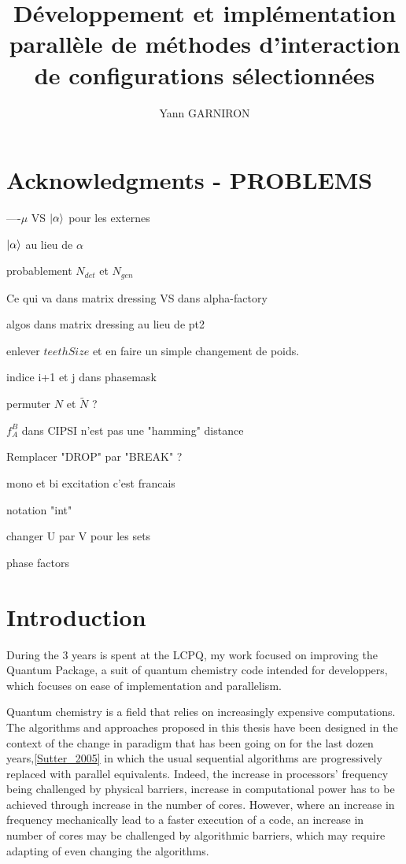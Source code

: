 \documentclass[12pt,a4paper]{report}
\title{Développement et implémentation parallèle de méthodes d'interaction de configurations sélectionnées}
\author{Yann GARNIRON}
\begin{document}
\dominitoc

\makeflyleaf
\newpage

\chapter*{Acknowledgments - PROBLEMS}





----$\mu$ VS $\ket \alpha$ pour les externes

$\ket \alpha$ au lieu de $\alpha$

probablement $N_{det}$ et $N_{gen}$

Ce qui va dans matrix dressing VS dans alpha-factory

algos dans matrix dressing au lieu de pt2

enlever $teethSize$ et en faire un simple changement de poids.

indice i+1 et j dans phasemask

permuter $N$ et $\tilde N$ ?

$f_A^B$ dans CIPSI n'est pas une "hamming" distance

Remplacer "DROP" par "BREAK" ?

mono et bi excitation c'est francais

notation "int"

changer U par V pour les sets

phase factors

\newpage

\tableofcontents
\newpage


\chapter{Introduction}

During the 3 years is spent at the LCPQ, my work focused on improving the Quantum Package, a suit of quantum chemistry code intended for developpers, which focuses on ease of implementation and parallelism.

Quantum chemistry is a field that relies on increasingly expensive computations. The algorithms and approaches proposed in this thesis have been designed in the context of the change in paradigm that has been going on for the last dozen years,\ref{Sutter_2005} in which the usual sequential algorithms are progressively replaced with parallel equivalents. Indeed, the increase in processors' frequency being challenged by physical barriers, increase in computational power has to be achieved through increase in the number of cores. However, where an increase in frequency mechanically lead to a faster execution of a code, an increase in number of cores may be challenged by algorithmic barriers, which may require adapting of even changing the algorithms.
\end{document}
